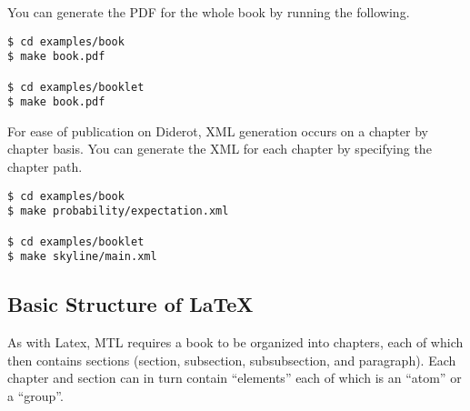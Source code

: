 \begin{example}
You can generate the PDF for the whole book by running the following.
%
\begin{lstlisting}
$ cd examples/book
$ make book.pdf

$ cd examples/booklet
$ make book.pdf
\end{lstlisting}
\end{example}

\begin{example}
For ease of publication on Diderot, XML generation occurs on a chapter by chapter basis.
%
You can generate the XML for  each chapter by specifying the chapter path.
\begin{lstlisting}
$ cd examples/book
$ make probability/expectation.xml

$ cd examples/booklet
$ make skyline/main.xml
\end{lstlisting}
\end{example}


\subsection{Basic Structure of LaTeX} 

As with Latex, MTL requires a book to be organized into chapters, each of which then contains sections (section, subsection, subsubsection, and paragraph).  Each chapter and section can in turn contain ``elements'' each of which is an ``atom'' or a  ``group''.


